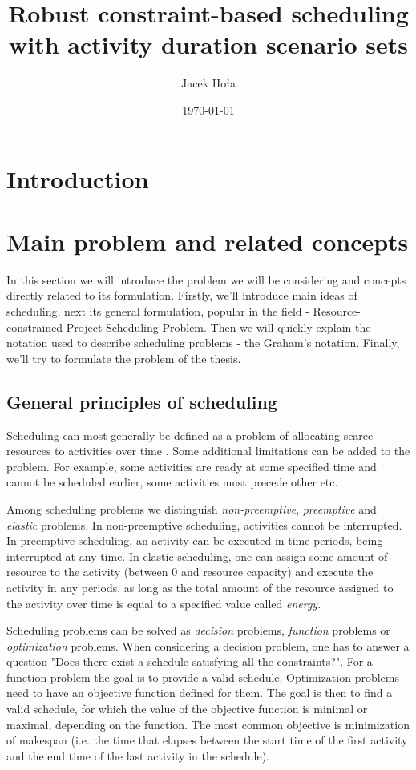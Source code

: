 \documentclass{article}
\theoremstyle{definition}
\begin{document}
 

\title{Robust constraint-based scheduling with activity duration scenario sets}
\author{Jacek Hoła}
\date{\today}
\maketitle
\newpage

\tableofcontents
\newpage

\section{Introduction}

\section{Main problem and related concepts}
In this section we will introduce the problem we will be considering and concepts directly related to its formulation. Firstly, we'll introduce main ideas of scheduling, next its general formulation, popular in the field - Resource-constrained Project Scheduling Problem. Then we will quickly explain the notation used to describe scheduling problems - the Graham's notation. Finally, we'll try to formulate the problem of the thesis.


\subsection{General principles of scheduling}
Scheduling can most generally be defined as a problem of allocating scarce resources to activities over time \cite{Baker:Introduction}. 
Some additional limitations can be added to the problem. For example, some activities are ready at some specified time and cannot be scheduled earlier, some activities must precede other etc.

Among scheduling problems we distinguish \textit{non-preemptive}, \textit{preemptive} and \textit{elastic} problems. In non-preemptive scheduling, activities cannot be interrupted. In preemptive scheduling, an activity can be executed in time periods, being interrupted at any time. In elastic scheduling, one can assign some amount of resource to the activity (between 0 and resource capacity) and execute the activity in any periods, as long as the total amount of the resource assigned to the activity over time is equal to a specified value called \textit{energy}.

Scheduling problems can be solved as \textit{decision} problems, \textit{function} problems or \textit{optimization} problems. When considering a decision problem, one has to answer a question "Does there exist a schedule satisfying all the constraints?". For a function problem the goal is to provide a valid schedule. Optimization problems need to have an objective function defined for them. The goal is then to find a valid schedule, for which the value of the objective function is minimal or maximal, depending on the function. The most common objective is minimization of makespan (i.e. the time that elapses between the start time of the first activity and the end time of the last activity in the schedule).
\end{document}
